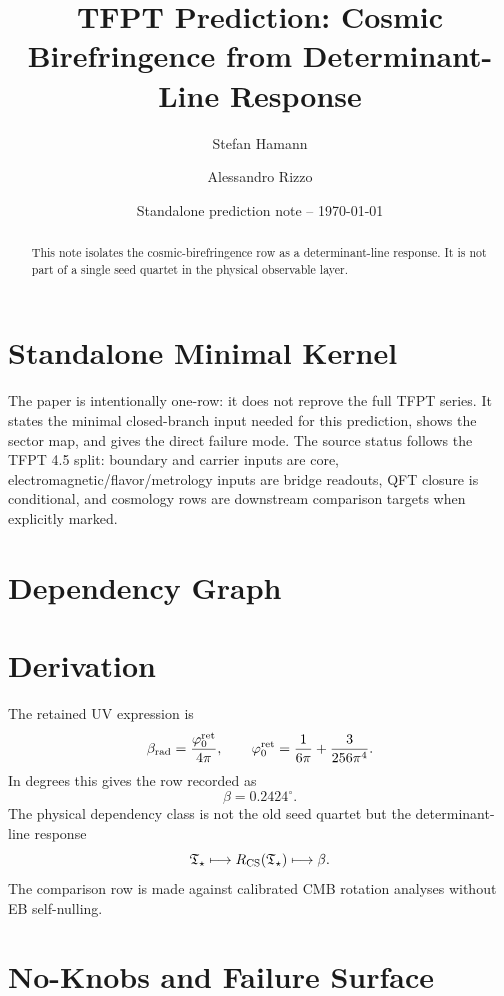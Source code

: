\documentclass[11pt,a4paper]{article}
\title{\color{tfptblue}\textbf{TFPT Prediction: Cosmic Birefringence from Determinant-Line Response}}
\author{Stefan Hamann \and Alessandro Rizzo}
\date{{\normalsize\color{tfptgray}\sffamily Standalone prediction note -- \today}}
\begin{document}
\maketitle

\begin{abstract}
This note isolates the cosmic-birefringence row as a determinant-line response. It is not part of a single seed quartet in the physical observable layer.
\end{abstract}



\section{Standalone Minimal Kernel}
\MinimalKernelBox

The paper is intentionally one-row: it does not reprove the full TFPT series. It states the minimal closed-branch input needed for this prediction, shows the sector map, and gives the direct failure mode. The source status follows the TFPT 4.5 split: boundary and carrier inputs are core, electromagnetic/flavor/metrology inputs are bridge readouts, QFT closure is conditional, and cosmology rows are downstream comparison targets when explicitly marked.


\section{Dependency Graph}

\section{Derivation}

The retained UV expression is
\[
\beta_{\mathrm{rad}}=\frac{\varphi_0^{\mathrm{ret}}}{4\pi},
\qquad
\varphi_0^{\mathrm{ret}}=\frac{1}{6\pi}+\frac{3}{256\pi^4}.
\]
In degrees this gives the row recorded as
\[
\beta=0.2424^\circ.
\]
The physical dependency class is not the old seed quartet but the determinant-line response
\[
\mathfrak T_{\star}\longmapsto R_{\mathrm{CS}}(\mathfrak T_{\star})\longmapsto \beta.
\]
The comparison row is made against calibrated CMB rotation analyses without EB self-nulling.


\section{No-Knobs and Failure Surface}
\end{document}

